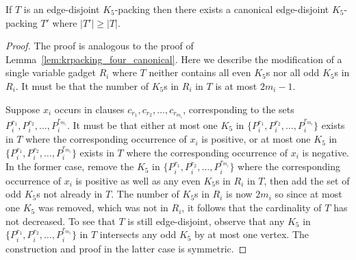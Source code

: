 \begin{lem}
If $T$ is an edge-disjoint $K_5$-packing then there exists a canonical edge-disjoint $K_5$-packing $T'$ where $|T'| \geq |T|$.
\label{lem:krpacking_five_canonical}
\end{lem}
\begin{proof}
The proof is analogous to the proof of Lemma~\ref{lem:krpacking_four_canonical}. Here we describe the modification of a single variable gadget $R_i$ where $T$ neither contains all even $K_5$s nor all odd $K_5$s in $R_i$. It must be that the number of $K_5$s in $R_i$ in $T$ is at most $2 m_i - 1$.



Suppose $x_i$ occurs in clauses $c_{r_1}, c_{r_2}, \dots, c_{r_{m_i}}$, corresponding to the sets $P_i^{r_1}, P_i^{r_2}, \dots, P_i^{r_{m_i}}$. It must be that either at most one $K_5$ in $\{ P_i^{r_1}, P_i^{r_2}, \dots, P_i^{r_{m_i}} \}$ exists in $T$ where the corresponding occurrence of $x_i$ is positive, or at most one $K_5$ in $\{ P_i^{r_1}, P_i^{r_2}, \dots, P_i^{r_{m_i}} \}$ exists in $T$ where the corresponding occurrence of $x_i$ is negative. In the former case, remove the $K_5$ in $\{ P_i^{r_1}, P_i^{r_2}, \dots, P_i^{r_{m_i}} \}$ where the corresponding occurrence of $x_i$ is positive as well as any even $K_5$s in $R_i$ in $T$, then add the set of odd $K_5$s not already in $T$. The number of $K_5$s in $R_i$ is now $2 m_i$ so since at most one $K_5$ was removed, which was not in $R_i$, it follows that the cardinality of $T$ has not decreased. To see that $T$ is still edge-disjoint, observe that any $K_5$ in $\{ P_i^{r_1}, P_i^{r_2}, \dots, P_i^{r_{m_i}} \}$ in $T$ intersects any odd $K_5$ by at most one vertex. The construction and proof in the latter case is symmetric.
\end{proof}

